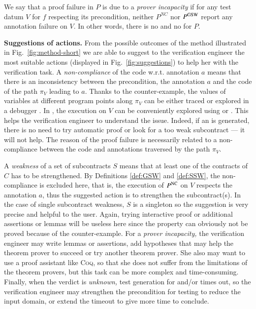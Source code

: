 \begin{definition} 
\label{def:prov-incap}
We say that a proof failure in $P$ is due to a \emph{prover incapacity} 
if for any test datum $V$ for $f$ respecting its precondition,
neither $P^{NC}$ nor $P^{\mathrm{GSW}}$ report any annotation failure on $V$.
In other words, there is no \NCCE and no \GSWCE for $P$.
\end{definition}



\textbf{Suggestions of actions.}
From the possible outcomes of the method illustrated in
Fig.~\ref{fig:method-short} we are able to suggest to the verification engineer 
the most suitable actions (displayed in Fig.~\ref{fig:suggestions})
to help her with the verification task.
A \emph{non-compliance} of the code w.r.t. annotation $a$  means that 
there is an inconsistency between the precondition, the annotation $a$ and the code 
of the path $\pi_V$  leading to $a$.
Thanks to the counter-example, 
the values of variables at different program points along $\pi_V$ 
can be either traced or explored in a debugger \cite{Muller/FM11}. 
In \framac, the execution on $V$ can be 
conveniently explored using \Value or \pathcrawler.
This helps the verification engineer to understand the issue.
Indeed, if an \NCCE is generated, there is no need to
try automatic proof or look for a too weak subcontract --- it will not help.
The reason of the proof failure is necessarily related 
to a non-compliance between 
the code and annotations
traversed by the path $\pi_V$.

A \emph{weakness} of a set of subcontracts $S$ means that at least one of the contracts of $C$
has to be strengthened. By Definitions \ref{def:GSW} and \ref{def:SSW}, the non-compliance is excluded here, 
that is, the execution of $P^{\mathrm{NC}}$ on  $V$  respects the annotation $a$, thus
the suggested action is to strengthen the subcontract(s).
In the case of single subcontract weakness, $S$ is a singleton so the suggestion
is very precise and helpful to the user.
Again, trying interactive proof or additional assertions or lemmas 
will be useless here since the property can obviously not be proved 
because of the counter-example.
For a \emph{prover incapacity,} the verification engineer
may write lemmas or assertions, add hypotheses that may help the theorem prover to
succeed or try another theorem prover.
She also may want to use a proof assistant like \textsc{Coq}, so that she does
not suffer from the limitations of the theorem provers, but 
this task can be more complex and time-consuming.
Finally, when the verdict is \emph{unknown,} test generation for \NCD and/or \SWD times out, 
so the verification engineer may strengthen the
precondition for testing to reduce the input domain, or extend the timeout to
give \stady more time to conclude.


